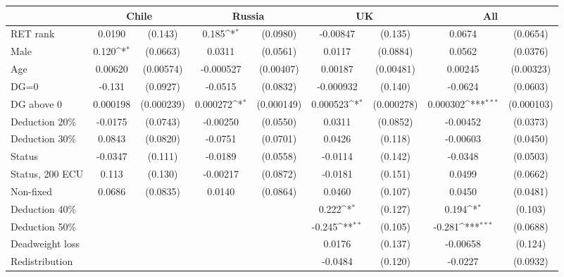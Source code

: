 {
\def\sym#1{\ifmmode^{#1}\else\(^{#1}\)\fi}
\begin{tabular}{l*{4}{cc}}
\hline\hline
                &\multicolumn{2}{c}{Chile}   &\multicolumn{2}{c}{Russia}  &\multicolumn{2}{c}{UK}      &\multicolumn{2}{c}{All}     \\
\hline
RET rank        &   0.0190         &  (0.143)&    0.185\sym{*}  & (0.0980)& -0.00847         &  (0.135)&   0.0674         & (0.0654)\\
Male            &    0.120\sym{*}  & (0.0663)&   0.0311         & (0.0561)&   0.0117         & (0.0884)&   0.0562         & (0.0376)\\
Age             &  0.00620         &(0.00574)&-0.000527         &(0.00407)&  0.00187         &(0.00481)&  0.00245         &(0.00323)\\
DG=0            &   -0.131         & (0.0927)&  -0.0515         & (0.0832)&-0.000932         &  (0.140)&  -0.0624         & (0.0603)\\
DG above 0      & 0.000198         &(0.000239)& 0.000272\sym{*}  &(0.000149)& 0.000523\sym{*}  &(0.000278)& 0.000302\sym{***}&(0.000103)\\
Deduction 20\%  &  -0.0175         & (0.0743)& -0.00250         & (0.0550)&   0.0311         & (0.0852)& -0.00452         & (0.0373)\\
Deduction 30\%  &   0.0843         & (0.0820)&  -0.0751         & (0.0701)&   0.0426         &  (0.118)& -0.00603         & (0.0450)\\
Status          &  -0.0347         &  (0.111)&  -0.0189         & (0.0558)&  -0.0114         &  (0.142)&  -0.0348         & (0.0503)\\
Status, 200 ECU &    0.113         &  (0.130)& -0.00217         & (0.0872)&  -0.0181         &  (0.151)&   0.0499         & (0.0662)\\
Non-fixed       &   0.0686         & (0.0835)&   0.0140         & (0.0864)&   0.0460         &  (0.107)&   0.0450         & (0.0481)\\
Deduction 40\%  &                  &         &                  &         &    0.222\sym{*}  &  (0.127)&    0.194\sym{*}  &  (0.103)\\
Deduction 50\%  &                  &         &                  &         &   -0.245\sym{**} &  (0.105)&   -0.281\sym{***}& (0.0688)\\
Deadweight loss &                  &         &                  &         &   0.0176         &  (0.137)& -0.00658         &  (0.124)\\
Redistribution  &                  &         &                  &         &  -0.0484         &  (0.120)&  -0.0227         & (0.0932)\\

\end{tabular}}
